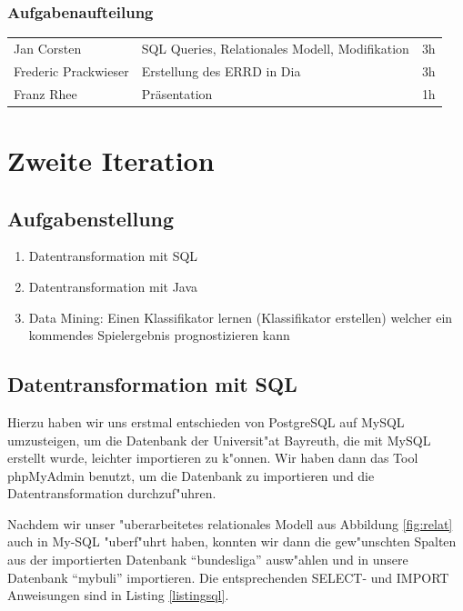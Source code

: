 \documentclass[
10pt,
a4paper
]{scrartcl}
\begin{document}
\subsubsection{Aufgabenaufteilung}
\begin{tabular}{ l l c }
Jan Corsten & SQL Queries, Relationales Modell, Modifikation &  3h \\
Frederic Prackwieser & Erstellung des ERRD in Dia  & 3h \\
Franz Rhee & Präsentation & 1h \\
\end{tabular}

\section{ Zweite Iteration}

\subsection{Aufgabenstellung}

\begin{enumerate}
  \item Datentransformation mit SQL  
  \item Datentransformation mit Java
  \item Data Mining: Einen Klassifikator lernen (Klassifikator erstellen) welcher ein kommendes Spielergebnis prognostizieren kann
\end{enumerate}

\subsection{Datentransformation mit SQL}
Hierzu haben wir uns erstmal entschieden von PostgreSQL auf MySQL umzusteigen, um die Datenbank der Universit"at Bayreuth, die mit MySQL erstellt wurde, leichter importieren zu k"onnen. Wir haben dann das Tool phpMyAdmin benutzt, um die Datenbank zu importieren und die Datentransformation durchzuf"uhren.

Nachdem wir unser "uberarbeitetes relationales Modell aus Abbildung \ref{fig:relat} auch in My{-}SQL "uberf"uhrt haben, konnten wir dann die gew"unschten Spalten aus der importierten Datenbank "`bundesliga"' ausw"ahlen und in unsere Datenbank "`mybuli"' importieren. Die entsprechenden SELECT- und IMPORT Anweisungen sind in Listing \ref{listingsql}.


\end{document}
